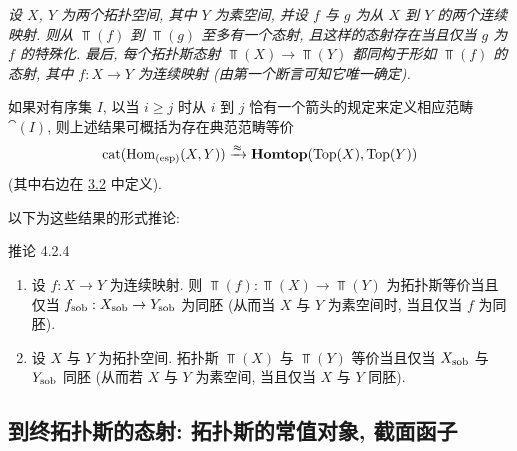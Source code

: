 \subsubsection{}
\emph{设 $X$, $Y$ 为两个拓扑空间, 其中 $Y$ 为素空间, 并设 $f$ 与 $g$ 为从 $X$ 到 $Y$ 的两个连续映射. 则从 $\Top(f)$ 到 $\Top(g)$ 至多有一个态射, 且这样的态射存在当且仅当 $g$ 为 $f$ 的特殊化. 最后, 每个拓扑斯态射 $\Top(X)\rightarrow \Top(Y)$ 都同构于形如 $\Top(f)$ 的态射, 其中 $f:X\rightarrow Y$ 为连续映射 (由第一个断言可知它唯一确定).}

如果\pageoriginale 对有序集 $I$, 以当 $i\geq j$ 时从 $i$ 到 $j$ 恰有一个箭头的规定来定义相应范畴 $\cat(I)$, 则上述结果可概括为存在典范范畴等价
$$
\operatorname{cat}(\operatorname{Hom}_{(\operatorname{esp})}(X,Y))\xrightarrow{\approx}\operatorname{\mathbf{Homtop}}(\operatorname{Top}(X),\operatorname{Top}(Y))
$$
(其中右边在 \hyperref[IV.subsec3.2]{3.2} 中定义).

以下为这些结果的形式推论:

\begin{enonce*}{推论 4.2.4}
\begin{enumerate}
\renewcommand{\theenumi}{\alph{enumi}}
\renewcommand{\labelenumi}{\theenumi)}
\item 设 $f:X\rightarrow Y$ 为连续映射. 则 $\Top(f):\Top(X)\rightarrow \Top(Y)$ 为拓扑斯等价当且仅当 $f_{\operatorname{sob}}:X_{\operatorname{sob}}\rightarrow Y_{\operatorname{sob}}$ 为同胚 (从而当 $X$ 与 $Y$ 为素空间时, 当且仅当 $f$ 为同胚).

\item 设 $X$ 与 $Y$ 为拓扑空间. 拓扑斯 $\Top(X)$ 与 $\Top(Y)$ 等价当且仅当 $X_{\operatorname{sob}}$ 与 $Y_{\operatorname{sob}}$ 同胚 (从而若 $X$ 与 $Y$ 为素空间, 当且仅当 $X$ 与 $Y$ 同胚).
\end{enumerate}
\end{enonce*}

\subsection{到终拓扑斯的态射: 拓扑斯的常值对象, 截面函子}

